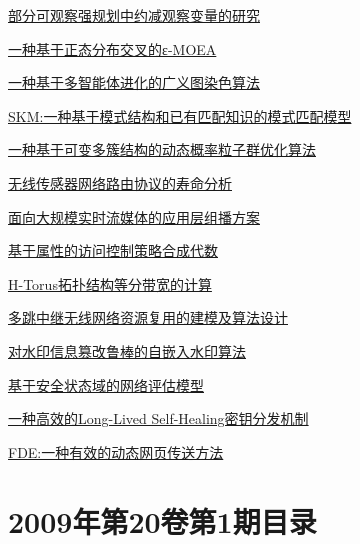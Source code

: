 \documentclass[a4paper]{article}
\begin{document}
\href{http://www.jos.org.cn/ch/reader/download_pdf.aspx?file_no=3152&year_id=2009&quarter_id=2&falg=1}{部分可观察强规划中约减观察变量的研究}

\href{http://www.jos.org.cn/ch/reader/download_pdf.aspx?file_no=3183&year_id=2009&quarter_id=2&falg=1}{一种基于正态分布交叉的ε-MOEA}

\href{http://www.jos.org.cn/ch/reader/download_pdf.aspx?file_no=3199&year_id=2009&quarter_id=2&falg=1}{一种基于多智能体进化的广义图染色算法}

\href{http://www.jos.org.cn/ch/reader/download_pdf.aspx?file_no=3203&year_id=2009&quarter_id=2&falg=1}{SKM:一种基于模式结构和已有匹配知识的模式匹配模型}

\href{http://www.jos.org.cn/ch/reader/download_pdf.aspx?file_no=3237&year_id=2009&quarter_id=2&falg=1}{一种基于可变多簇结构的动态概率粒子群优化算法}

\href{http://www.jos.org.cn/ch/reader/download_pdf.aspx?file_no=3180&year_id=2009&quarter_id=2&falg=1}{无线传感器网络路由协议的寿命分析}

\href{http://www.jos.org.cn/ch/reader/download_pdf.aspx?file_no=3176&year_id=2009&quarter_id=2&falg=1}{面向大规模实时流媒体的应用层组播方案}

\href{http://www.jos.org.cn/ch/reader/download_pdf.aspx?file_no=3279&year_id=2009&quarter_id=2&falg=1}{基于属性的访问控制策略合成代数}

\href{http://www.jos.org.cn/ch/reader/download_pdf.aspx?file_no=3168&year_id=2009&quarter_id=2&falg=1}{H-Torus拓扑结构等分带宽的计算}

\href{http://www.jos.org.cn/ch/reader/download_pdf.aspx?file_no=3204&year_id=2009&quarter_id=2&falg=1}{多跳中继无线网络资源复用的建模及算法设计}

\href{http://www.jos.org.cn/ch/reader/download_pdf.aspx?file_no=3184&year_id=2009&quarter_id=2&falg=1}{对水印信息篡改鲁棒的自嵌入水印算法}

\href{http://www.jos.org.cn/ch/reader/download_pdf.aspx?file_no=3172&year_id=2009&quarter_id=2&falg=1}{基于安全状态域的网络评估模型}

\href{http://www.jos.org.cn/ch/reader/download_pdf.aspx?file_no=3177&year_id=2009&quarter_id=2&falg=1}{一种高效的Long-Lived Self-Healing密钥分发机制}

\href{http://www.jos.org.cn/ch/reader/download_pdf.aspx?file_no=553&year_id=2009&quarter_id=2&falg=1}{FDE:一种有效的动态网页传送方法}


\section{\textbf{2009年第20卷第1期目录}}
\end{document}
